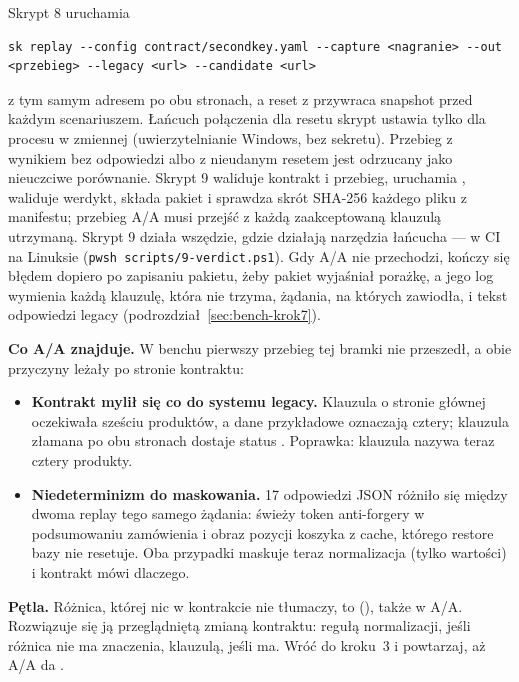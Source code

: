 Skrypt 8 uruchamia
\begin{lstlisting}
sk replay --config contract/secondkey.yaml --capture <nagranie> --out <przebieg> --legacy <url> --candidate <url>
\end{lstlisting}
z tym samym adresem po obu stronach, a reset
 z  przywraca snapshot przed każdym
scenariuszem. Łańcuch połączenia dla resetu skrypt ustawia tylko dla procesu 
w zmiennej  (uwierzytelnianie Windows, bez sekretu). Przebieg
z wynikiem bez odpowiedzi albo z nieudanym resetem jest odrzucany jako nieuczciwe
porównanie. Skrypt 9 waliduje kontrakt i przebieg, uruchamia , waliduje
werdykt, składa pakiet  i sprawdza skrót SHA-256 każdego pliku z
manifestu; przebieg A/A musi przejść z każdą zaakceptowaną klauzulą utrzymaną. Skrypt 9
działa wszędzie, gdzie działają narzędzia łańcucha --- w CI na Linuksie
(\texttt{pwsh scripts/9-verdict.ps1}). Gdy A/A nie przechodzi, kończy się błędem dopiero po
zapisaniu pakietu, żeby pakiet wyjaśniał porażkę, a jego log wymienia każdą klauzulę, która
nie trzyma, żądania, na których zawiodła, i tekst odpowiedzi legacy
(podrozdział~\ref{sec:bench-krok7}).

\textbf{Co A/A znajduje.} W benchu pierwszy przebieg tej bramki nie przeszedł, a obie
przyczyny leżały po stronie kontraktu:
\begin{itemize}
  \item \textbf{Kontrakt mylił się co do systemu legacy.} Klauzula o stronie głównej
        oczekiwała sześciu produktów, a dane przykładowe oznaczają cztery; klauzula
        złamana po obu stronach dostaje status . Poprawka:
        klauzula nazywa teraz cztery produkty.
  \item \textbf{Niedeterminizm do maskowania.} 17 odpowiedzi JSON różniło się między dwoma
        replay tego samego żądania: świeży token anti-forgery w podsumowaniu zamówienia i
        obraz pozycji koszyka z cache, którego restore bazy nie resetuje. Oba przypadki
        maskuje teraz normalizacja (tylko wartości) i kontrakt mówi dlaczego.
\end{itemize}

\textbf{Pętla.} Różnica, której nic w kontrakcie nie tłumaczy, to 
(), także w A/A. Rozwiązuje się ją przeglądniętą zmianą
kontraktu: regułą normalizacji, jeśli różnica nie ma znaczenia, klauzulą, jeśli ma. Wróć
do kroku~3 i powtarzaj, aż A/A da .

